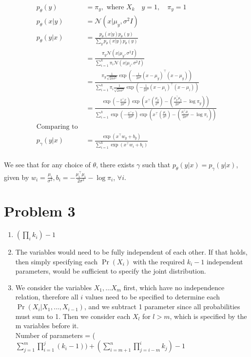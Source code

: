 \documentclass[12pt]{article}
\begin{document}
\begin{align*}
  p_\theta(y) &= \pi_y, \text{ where } X_k \quad y = 1, \quad \pi_y = 1 \\
  p_\theta(x | y) &= \mathcal{N}(x | \mu_y, \sigma^2I) \\
  p_\theta(y | x) &=\frac{p_\theta(x | y) p_\theta(y)}{\sum_y p_\theta(x | y) p_\theta(y)} \\
  &= \frac{\pi_y \mathcal{N}(x | \mu_y, \sigma^2I)}{\sum_{i=1}^k \pi_i \mathcal{N}(x | \mu_i, \sigma^2I)} \\
  &= \frac{\pi_y \frac{1}{\sqrt{2\pi\sigma^2}} \exp\left(-\frac{1}{2\sigma^2} (x - \mu_y)^\top (x - \mu_y)\right)}{\sum_{i=1}^k \pi_i \frac{1}{\sqrt{2\pi\sigma^2}} \exp\left(-\frac{1}{2\sigma^2} (x - \mu_i)^\top (x - \mu_i)\right)} \\
  &= \frac{\exp\left(-\frac{x^\top x}{2\sigma^2}  \right) \exp\left(x^\top (\frac{\mu_y}{\sigma^2} ) - (\frac{\mu_y^\top \mu_y}{2\sigma^2} - \log \pi_y)  \right)}{\sum_{i=1}^k \exp\left(-\frac{x^\top x}{2\sigma^2} \right) \exp\left(x^\top (\frac{\mu_i}{\sigma^2} ) - (\frac{\mu_i^\top \mu_i}{2\sigma^2} - \log \pi_i)  \right)} \\
  \text{Comparing to }\\
  p_\gamma(y | x) &= \frac{\exp(x^\top w_y + b_y)}{\sum_{i=1}^k \exp(x^\top w_i + b_i)} \\
\end{align*}
  
We see that for any choice of $\theta$, there exists $\gamma$ such that $p_\theta(y | x) = p_\gamma(y | x)$, 
given by $w_i = \frac{\mu_i}{\sigma^2}, b_i = -\frac{\mu_i^\top \mu_i}{2\sigma^2} - \log \pi_i$, $\forall i$.


\section*{Problem 3}
\begin{enumerate}[label=(\arabic*)]
  \item $ (\prod_i k_i ) - 1$ 
  \item The variables would need to be fully independent of each other. If that holds, then simply 
  specifying each $\Pr(X_i)$ with the required $k_i - 1$ independent parameters, would be sufficient to specify the joint distribution.
  \item We consider the variables $X_1, \dots X_m$ first, which have no independence relation, therefore all $i$ values 
  need to be specified to determine each $\Pr(X_i|X_1,...,X_{i-1})$, and we subtract 1 parameter since all probabilities must sum to 1. 
  Then we consider each $X_l$ for $l>m$, which is specified by the m variables before it. \\
  Number of parameters = ($\sum_{j=1}^{m} \prod_{i=1}^{j} (k_i - 1) ) + (\sum_{i=m+1}^{n} \prod_{j=i-m}^{i} k_j) - 1$
\end{enumerate}
\end{document}
